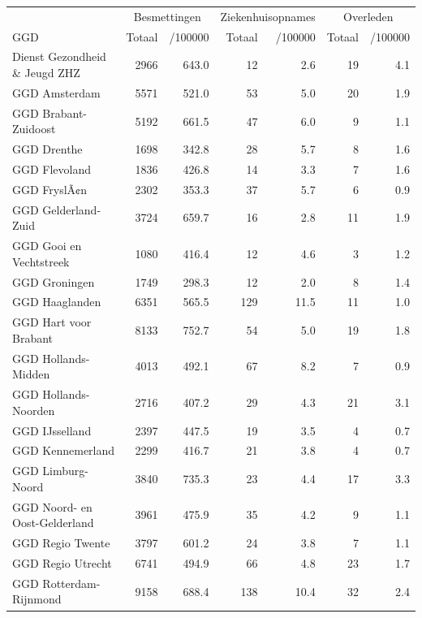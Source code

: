 \documentclass[
  english,
  man,floatsintext]{apa6}
\begin{document}
\begin{table}
\centering\begingroup\fontsize{10}{12}\selectfont

\begin{threeparttable}
\begin{tabular}{lrrrrrr}
\toprule
\multicolumn{1}{c}{ } & \multicolumn{2}{c}{Besmettingen} & \multicolumn{2}{c}{Ziekenhuisopnames} & \multicolumn{2}{c}{Overleden} \\
\cmidrule(l{3pt}r{3pt}){2-3} \cmidrule(l{3pt}r{3pt}){4-5} \cmidrule(l{3pt}r{3pt}){6-7}
GGD & Totaal & /100000 & Totaal & /100000 & Totaal & /100000\\
\midrule
Dienst Gezondheid \& Jeugd ZHZ & 2966 & 643.0 & 12 & 2.6 & 19 & 4.1\\
GGD Amsterdam & 5571 & 521.0 & 53 & 5.0 & 20 & 1.9\\
GGD Brabant-Zuidoost & 5192 & 661.5 & 47 & 6.0 & 9 & 1.1\\
GGD Drenthe & 1698 & 342.8 & 28 & 5.7 & 8 & 1.6\\
GGD Flevoland & 1836 & 426.8 & 14 & 3.3 & 7 & 1.6\\
GGD FryslÃ¢n & 2302 & 353.3 & 37 & 5.7 & 6 & 0.9\\
GGD Gelderland-Zuid & 3724 & 659.7 & 16 & 2.8 & 11 & 1.9\\
GGD Gooi en Vechtstreek & 1080 & 416.4 & 12 & 4.6 & 3 & 1.2\\
GGD Groningen & 1749 & 298.3 & 12 & 2.0 & 8 & 1.4\\
GGD Haaglanden & 6351 & 565.5 & 129 & 11.5 & 11 & 1.0\\
GGD Hart voor Brabant & 8133 & 752.7 & 54 & 5.0 & 19 & 1.8\\
GGD Hollands-Midden & 4013 & 492.1 & 67 & 8.2 & 7 & 0.9\\
GGD Hollands-Noorden & 2716 & 407.2 & 29 & 4.3 & 21 & 3.1\\
GGD IJsselland & 2397 & 447.5 & 19 & 3.5 & 4 & 0.7\\
GGD Kennemerland & 2299 & 416.7 & 21 & 3.8 & 4 & 0.7\\
GGD Limburg-Noord & 3840 & 735.3 & 23 & 4.4 & 17 & 3.3\\
GGD Noord- en Oost-Gelderland & 3961 & 475.9 & 35 & 4.2 & 9 & 1.1\\
GGD Regio Twente & 3797 & 601.2 & 24 & 3.8 & 7 & 1.1\\
GGD Regio Utrecht & 6741 & 494.9 & 66 & 4.8 & 23 & 1.7\\
GGD Rotterdam-Rijnmond & 9158 & 688.4 & 138 & 10.4 & 32 & 2.4\\

\end{tabular}
\end{threeparttable}
\end{table}
\end{document}
